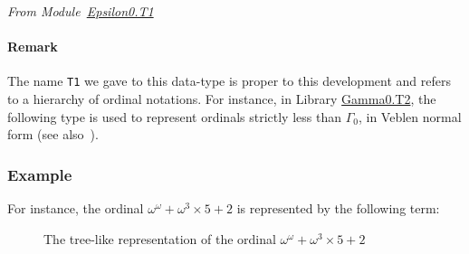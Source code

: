 \vspace{4pt}
\noindent\emph{From Module~\href{../theories/html/hydras.Epsilon0.T1.html\#T1}{Epsilon0.T1}}

\label{types:T1}





\paragraph{Remark}
The name \texttt{T1} we gave to this data-type  is proper to this development and refers
to a hierarchy of ordinal notations. For instance, in Library \href{../theories/html/hydras.Gamma0.T2.html}{Gamma0.T2},  the following type is used to represent ordinals strictly less than \(\Gamma_0\),  in Veblen normal form (see also~\cite{schutte}).
\noindent




\subsubsection{Example}

\label{alpha0-def}
For instance, the ordinal  $\omega^\omega+\omega^3\times 5+2$ is represented by the following term:





\begin{figure}[htb]
\centering
{}

\caption{The tree-like representation of the ordinal $\omega^\omega+\omega^3\times 5 +2$\label{fig:cnf-tree}}

\end{figure}



